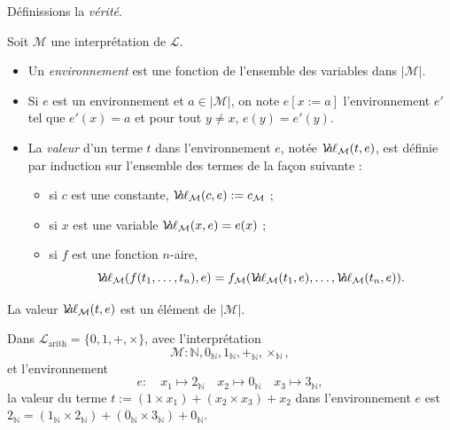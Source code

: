 \documentclass[./main]{subfiles}
\begin{document}
  Définissions la \textit{vérité}.

  \begin{defn}
    Soit $\mathcal{M}$ une interprétation de $\mathcal{L}$.
    \begin{itemize}
      \item Un \textit{environnement} est une fonction de l'ensemble des variables dans $|\mathcal{M}|$.
      \item Si $e$ est un environnement et $a \in |\mathcal{M}|$, on note $e[x:=a]$ l'environnement $e'$ tel que $e'(x) = a$ et pour tout $y \neq x$, $e(y) = e'(y)$.
      \item La \textit{valeur} d'un terme $t$ dans l'environnement $e$, notée $\mathcal{V}\hspace{-3.5pt}a\hspace{-0.5pt}\ell_{\mathcal{M}}(t,e)$, est définie par induction sur l'ensemble des termes de la façon suivante :

        \begin{itemize}
          \item si $c$ est une constante, $\mathcal{V}\hspace{-3.5pt}a\hspace{-0.5pt}\ell_{\mathcal{M}}(c, e) := c_{\mathcal{M}}$ ;
          \item si $x$ est une variable $\mathcal{V}\hspace{-3.5pt}a\hspace{-0.5pt}\ell_{\mathcal{M}}(x,e) = e(x)$ ;
          \item si $f$ est une fonction $n$-aire,
            \[
            \mathcal{V}\hspace{-3.5pt}a\hspace{-0.5pt}\ell_{\mathcal{M}}(f(t_1, \mathinner{\ldotp\ldotp\ldotp}, t_n), e) = f_{\mathcal{M}}(\mathcal{V}\hspace{-3.5pt}a\hspace{-0.5pt}\ell_{\mathcal{M}}(t_1, e), \mathinner{\ldotp\ldotp\ldotp}, \mathcal{V}\hspace{-3.5pt}a\hspace{-0.5pt}\ell_{\mathcal{M}}(t_n, e))
            .\] 
        \end{itemize}
    \end{itemize}
  \end{defn}

  \begin{rmk}
    La valeur $\mathcal{V}\hspace{-3.5pt}a\hspace{-0.5pt}\ell_{\mathcal{M}}(t, e)$ est un élément de $|\mathcal{M}|$.
  \end{rmk}

  \begin{exm}
    Dans $\mathcal{L}_\mathrm{arith} = \{0, 1, +, \times\}$, avec l'interprétation \[
    \mathcal{M} : \mathds{N}, 0_\mathds{N}, 1_\mathds{N}, +_\mathds{N}, \times_\mathds{N}
    ,\] et l'environnement \[
    e : \quad x_1 \mapsto 2_\mathds{N} \quad x_2 \mapsto 0_\mathds{N} \quad x_3 \mapsto 3_\mathds{N}
    ,\] 
    la valeur du terme $t := (1 \times x_1) + (x_2 \times x_3) + x_2$ dans l'environnement $e$ est $2_\mathds{N} = (1_\mathds{N} \times 2_\mathds{N}) + (0_\mathds{N} \times 3_\mathds{N}) + 0_\mathds{N} $.
  \end{exm}
\end{document}
